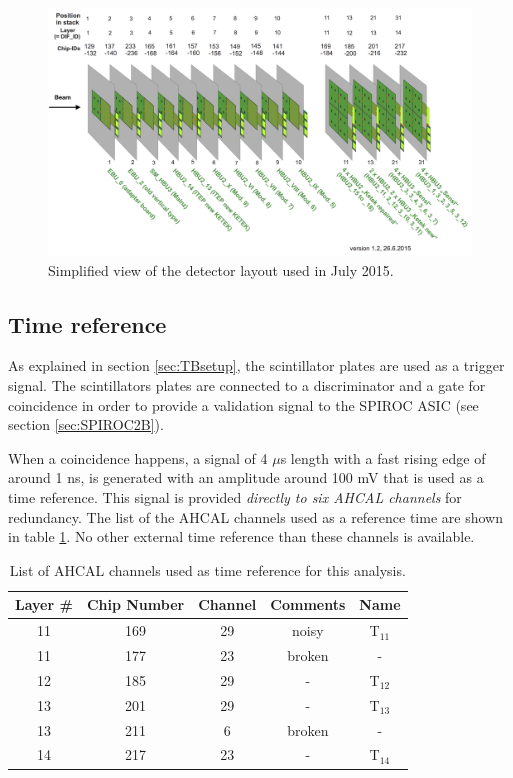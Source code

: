 \begin{figure}[htbp!]
	\centering
	\includegraphics[width=0.7\linewidth]{chap5/fig_EnergyCalib/Detector_layout_copy.png}
	\caption{Simplified view of the detector layout used in July 2015.} \label{fig:Det_layout}
\end{figure}

\subsection{Time reference}
\label{subsec:trigger}

As explained in section \ref{sec:TBsetup}, the scintillator plates are used as a trigger signal. The scintillators plates are connected to a discriminator and a gate for coincidence in order to provide a validation signal to the SPIROC ASIC (see section \ref{sec:SPIROC2B}).

When a coincidence happens, a signal of 4 $\mu$s length with a fast rising edge of around 1 ns, is generated with an amplitude around 100 mV that is used as a time reference. This signal is provided \textit{directly to six AHCAL channels} for redundancy. The list of the AHCAL channels used as a reference time are shown in table \ref{table:trigger_signal_list}. No other external time reference than these channels is available.

\begin{table}[htb!]
	\centering
	\caption{List of AHCAL channels used as time reference for this analysis.}
	\label{table:trigger_signal_list}
	\begin{tabular}{@{} ccccc @{}}
		\toprule
		Layer \# & Chip Number & Channel & Comments & Name \\
		\midrule
		11 & 169 & 29 & noisy & T$_{11}$ \\
		11 & 177 & 23 & broken & - \\
		12 & 185 & 29 & - & T$_{12}$ \\
		13 & 201 & 29 & -  & T$_{13}$ \\
		13 & 211 & 6 & broken & - \\
		14 & 217 & 23 & - & T$_{14}$ \\
		\bottomrule
	\end{tabular}
\end{table}

